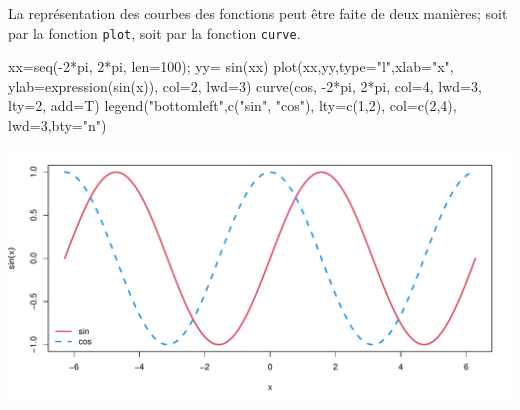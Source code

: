 \documentclass[
  8pt,
  ignorenonframetext,
]{beamer}
\newenvironment{Shaded}{\begin{snugshade}}{\end{snugshade}}
\newcommand{\AttributeTok}[1]{\textcolor[rgb]{0.77,0.63,0.00}{#1}}
\newcommand{\DecValTok}[1]{\textcolor[rgb]{0.00,0.00,0.81}{#1}}
\newcommand{\FunctionTok}[1]{\textcolor[rgb]{0.00,0.00,0.00}{#1}}
\newcommand{\NormalTok}[1]{#1}
\newcommand{\OtherTok}[1]{\textcolor[rgb]{0.56,0.35,0.01}{#1}}
\newcommand{\SpecialCharTok}[1]{\textcolor[rgb]{0.00,0.00,0.00}{#1}}
\newcommand{\StringTok}[1]{\textcolor[rgb]{0.31,0.60,0.02}{#1}}
\begin{document}
\begin{frame}[fragile]
La représentation des courbes des fonctions peut être faite de deux
manières; soit par la fonction \texttt{plot}, soit par la fonction
\texttt{curve}.

\begin{Shaded}
\begin{Highlighting}[]
\NormalTok{xx}\OtherTok{=}\FunctionTok{seq}\NormalTok{(}\SpecialCharTok{{-}}\DecValTok{2}\SpecialCharTok{*}\NormalTok{pi, }\DecValTok{2}\SpecialCharTok{*}\NormalTok{pi, }\AttributeTok{len=}\DecValTok{100}\NormalTok{); yy}\OtherTok{=} \FunctionTok{sin}\NormalTok{(xx)}
\FunctionTok{plot}\NormalTok{(xx,yy,}\AttributeTok{type=}\StringTok{"l"}\NormalTok{,}\AttributeTok{xlab=}\StringTok{"x"}\NormalTok{, }\AttributeTok{ylab=}\FunctionTok{expression}\NormalTok{(}\FunctionTok{sin}\NormalTok{(x)), }
     \AttributeTok{col=}\DecValTok{2}\NormalTok{, }\AttributeTok{lwd=}\DecValTok{3}\NormalTok{)}
\FunctionTok{curve}\NormalTok{(cos, }\SpecialCharTok{{-}}\DecValTok{2}\SpecialCharTok{*}\NormalTok{pi, }\DecValTok{2}\SpecialCharTok{*}\NormalTok{pi, }\AttributeTok{col=}\DecValTok{4}\NormalTok{, }\AttributeTok{lwd=}\DecValTok{3}\NormalTok{, }\AttributeTok{lty=}\DecValTok{2}\NormalTok{, }\AttributeTok{add=}\NormalTok{T)}
\FunctionTok{legend}\NormalTok{(}\StringTok{"bottomleft"}\NormalTok{,}\FunctionTok{c}\NormalTok{(}\StringTok{"sin"}\NormalTok{, }\StringTok{"cos"}\NormalTok{), }\AttributeTok{lty=}\FunctionTok{c}\NormalTok{(}\DecValTok{1}\NormalTok{,}\DecValTok{2}\NormalTok{), }\AttributeTok{col=}\FunctionTok{c}\NormalTok{(}\DecValTok{2}\NormalTok{,}\DecValTok{4}\NormalTok{), }
       \AttributeTok{lwd=}\DecValTok{3}\NormalTok{,}\AttributeTok{bty=}\StringTok{"n"}\NormalTok{)}
\end{Highlighting}
\end{Shaded}

\begin{center}\includegraphics{Chap2_R_files/figure-beamer/unnamed-chunk-4-1} \end{center}
\end{frame}
\end{document}
